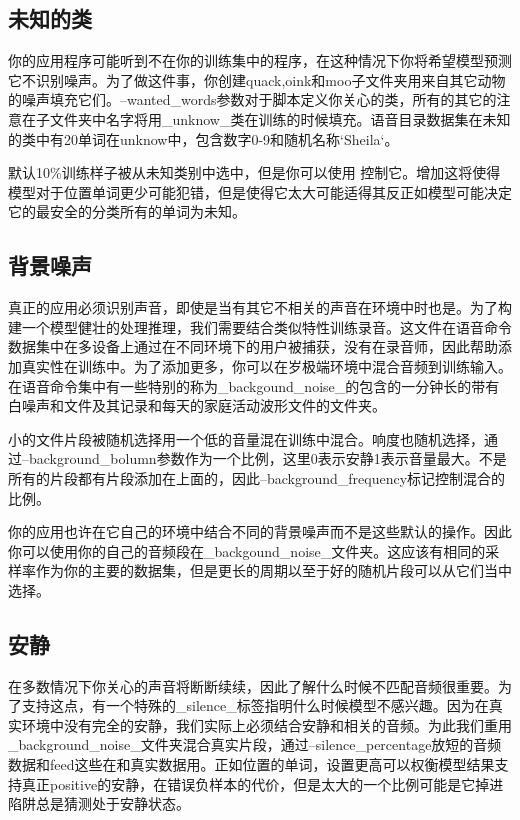 \subsection{未知的类}
你的应用程序可能听到不在你的训练集中的程序，在这种情况下你将希望模型预测它不识别噪声。为了做这件事，你创建quack,oink和moo子文件夹用来自其它动物的噪声填充它们。--wanted\_words参数对于脚本定义你关心的类，所有的其它的注意在子文件夹中名字将用\_unknow\_类在训练的时候填充。语音目录数据集在未知的类中有20单词在unknow中，包含数字0-9和随机名称`Sheila`。

默认10\%训练样子被从未知类别中选中，但是你可以使用 控制它。增加这将使得模型对于位置单词更少可能犯错，但是使得它太大可能适得其反正如模型可能决定它的最安全的分类所有的单词为未知。

\subsection{背景噪声}
真正的应用必须识别声音，即使是当有其它不相关的声音在环境中时也是。为了构建一个模型健壮的处理推理，我们需要结合类似特性训练录音。这文件在语音命令数据集中在多设备上通过在不同环境下的用户被捕获，没有在录音师，因此帮助添加真实性在训练中。为了添加更多，你可以在岁极端环境中混合音频到训练输入。在语音命令集中有一些特别的称为\_backgound\_noise\_的包含的一分钟长的带有白噪声和文件及其记录和每天的家庭活动波形文件的文件夹。

小的文件片段被随机选择用一个低的音量混在训练中混合。响度也随机选择，通过--background\_bolumn参数作为一个比例，这里0表示安静1表示音量最大。不是所有的片段都有片段添加在上面的，因此--background\_frequency标记控制混合的比例。

你的应用也许在它自己的环境中结合不同的背景噪声而不是这些默认的操作。因此你可以使用你的自己的音频段在\_backgound\_noise\_文件夹。这应该有相同的采样率作为你的主要的数据集，但是更长的周期以至于好的随机片段可以从它们当中选择。

\subsection{安静}
在多数情况下你关心的声音将断断续续，因此了解什么时候不匹配音频很重要。为了支持这点，有一个特殊的\_silence\_标签指明什么时候模型不感兴趣。因为在真实环境中没有完全的安静，我们实际上必须结合安静和相关的音频。为此我们重用\_background\_noise\_文件夹混合真实片段，通过--silence\_percentage放短的音频数据和feed这些在和真实数据用。正如位置的单词，设置更高可以权衡模型结果支持真正positive的安静，在错误负样本的代价，但是太大的一个比例可能是它掉进陷阱总是猜测处于安静状态。
